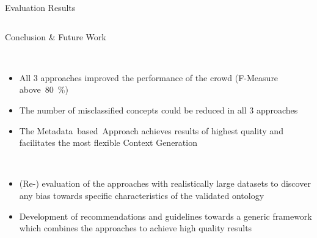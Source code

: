 \documentclass[final,hyperref={pdfpagelabels=true}]{beamer}
\begin{document}
\begin{frame}
\begin{columns}[t, onlytextwidth]
\begin{column}{\textwidth}
\begin{columns}[t, onlytextwidth]
\begin{column}{.49\textwidth}
\begin{block}{Evaluation Results}
\begin{minipage}[t][.22\textheight][c]{\textwidth}
					\end{minipage}
				\end{block}
			\end{column}
		\end{columns}
		\begin{columns}[t, onlytextwidth]
			\begin{column}{\textwidth}
				\begin{block}{Conclusion \& Future Work}
					\hfill
					\begin{minipage}[t][.09\textheight][c]{0.97\textwidth}
						\begin{multicols}{2}
							\footnotesize
							{}\\
							\vspace{-5mm}
							\begin{itemize}
								\footnotesize
								\justifying
								\setlength\itemsep{5mm}
								\item All 3 approaches improved the performance of the crowd (F-Measure above~80~\%)
								\item The number of misclassified concepts could be reduced in all 3 approaches
								\item The Metadata~based~Approach achieves results of highest quality and facilitates the most flexible Context Generation
							\end{itemize}
							\footnotesize
							{}\\
							\vspace{-1cm}
							\begin{itemize}
								\footnotesize
								\justifying
								\setlength\itemsep{5mm}
								\item (Re-) evaluation of the approaches with realistically large datasets to discover any bias towards specific characteristics of the validated ontology
								\item Development of recommendations and guidelines towards a generic framework which combines the approaches to achieve high quality results
							\end{itemize}
						\end{multicols}
					\end{minipage}
					\hfill
					\hbox{}
				\end{block}
			\end{column}
		\end{columns}
		

\end{column}
\end{columns}
\end{frame}
\end{document}
